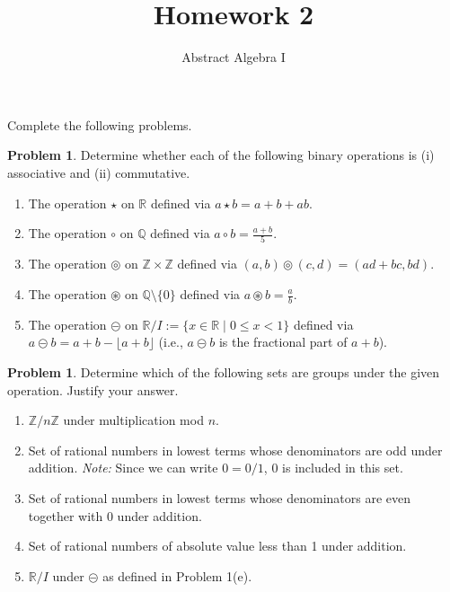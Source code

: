 \documentclass[11pt]{scrartcl}
\theoremstyle{definition}
\newtheorem{problem}[theorem]{Problem}
\begin{document}
\title{Homework 2}
\subtitle{Abstract Algebra I}
\date{}

\maketitle
\thispagestyle{fancy}

Complete the following problems.

\begin{problem}
Determine whether each of the following binary operations is (i) associative and (ii) commutative.
\begin{enumerate}[label=\rm{(\alph*)}]
\item The operation $\star$ on $\mathbb{R}$ defined via $a\star b=a+b+ab$.
\item The operation $\circ$ on $\mathbb{Q}$ defined via $\displaystyle a\circ b=\frac{a+b}{5}$.
\item The operation $\circledcirc$ on $\mathbb{Z}\times \mathbb{Z}$ defined via $(a,b)\circledcirc (c,d)=(ad+bc,bd)$.
\item The operation $\circledast$ on $\mathbb{Q}\setminus\{0\}$ defined via $\displaystyle a\circledast b=\frac{a}{b}$.
\item The operation $\circleddash$ on $\mathbb{R}/I:=\{x\in\mathbb{R}\mid 0\leq x<1\}$ defined via $a\circleddash b=a+b-\lfloor a+b\rfloor$ (i.e., $a\circleddash b$ is the fractional part of $a+b$).
\end{enumerate}
\end{problem}

\begin{problem}
Determine which of the following sets are groups under the given operation. Justify your answer.
\begin{enumerate}[label=\rm{(\alph*)}]
\item $\mathbb{Z}/n\mathbb{Z}$ under multiplication mod $n$.
\item Set of rational numbers in lowest terms whose denominators are odd under addition. \emph{Note:} Since we can write $0=0/1$, $0$ is included in this set.
\item Set of rational numbers in lowest terms whose denominators are even together with $0$ under addition.
\item Set of rational numbers of absolute value less than 1 under addition.
\item $\mathbb{R}/I$ under $\circleddash$ as defined in Problem 1(e). 
\end{enumerate}
\end{problem}
\end{document}
